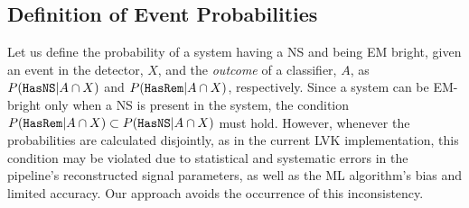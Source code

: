 \subsection*{Definition of Event Probabilities}

Let us define the probability of a system having a \ac{NS} and being \ac{EM} bright, given an event in the detector, $X$, and the \emph{outcome} of a classifier, $A$, as $P({{\tt HasNS}}|A\cap X)$ and
$P({{\tt HasRem}}|A\cap X)$, respectively. Since a system can be EM-bright only when a \ac{NS} is present in the system, the condition $P({{\tt HasRem}}|A \cap X)\subset P({{\tt HasNS}}|A \cap X)$ must hold. However,
whenever the probabilities are calculated disjointly, as in the current \ac{LVK} implementation, this condition may be violated due to statistical and systematic errors in the pipeline's
reconstructed signal parameters, as well as the \ac{ML} algorithm's bias and limited accuracy. Our approach avoids the occurrence of this inconsistency.


